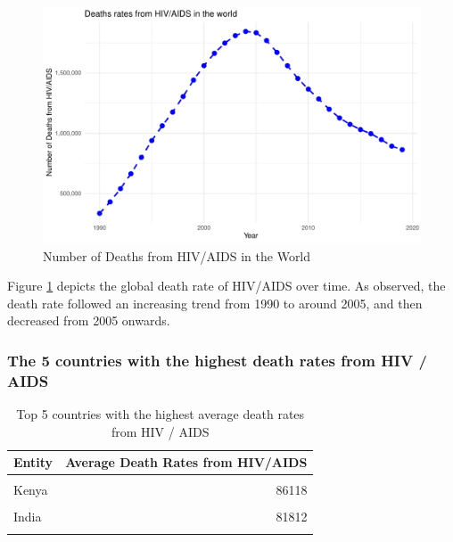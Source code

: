 \documentclass[11pt,a4paper,]{article}
\begin{document}
\begin{figure}
\centering
\includegraphics{report_files/figure-latex/WorldHIVtrend-1.pdf}
\caption{\label{fig:WorldHIVtrend}Number of Deaths from HIV/AIDS in the World}
\end{figure}

Figure \ref{fig:WorldHIVtrend} depicts the global death rate of HIV/AIDS over time. As observed, the death rate followed an increasing trend from 1990 to around 2005, and then decreased from 2005 onwards.

\clearpage

\hypertarget{the-5-countries-with-the-highest-death-rates-from-hiv-aids}{%
\subsubsection{\texorpdfstring{The 5 countries with the highest death rates from \textbf{HIV / AIDS}}{The 5 countries with the highest death rates from HIV / AIDS}}\label{the-5-countries-with-the-highest-death-rates-from-hiv-aids}}

\begin{table}[!h]

\caption{\label{tab:HIVtable}Top 5 countries with the highest average death rates from HIV / AIDS}
\centering
\begin{tabular}[t]{lr}
\toprule
Entity & Average Death Rates from HIV/AIDS\\
\midrule
\cellcolor{gray!6}{South Africa} & \cellcolor{gray!6}{162477}\\
Kenya & 86118\\
\cellcolor{gray!6}{Tanzania} & \cellcolor{gray!6}{82168}\\
India & 81812\\
\cellcolor{gray!6}{Nigeria} & \cellcolor{gray!6}{73891}\\
\bottomrule
\end{tabular}
\end{table}
\end{document}
